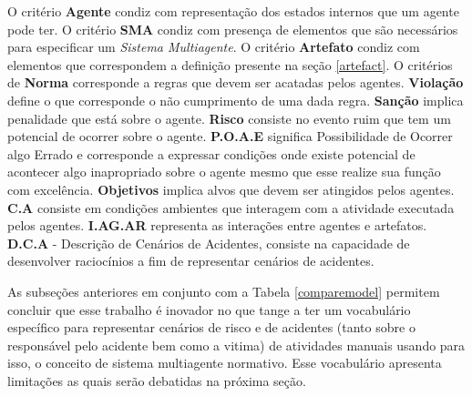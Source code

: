O critério \textbf{Agente} condiz com representação dos estados internos que um agente pode ter. O critério \textbf{SMA} condiz com presença de elementos que são necessários para especificar um \textit{Sistema Multiagente}. O critério \textbf{Artefato} condiz com elementos que correspondem a definição presente na seção \ref{artefact}. O critérios de \textbf{Norma} corresponde a regras que devem ser acatadas pelos agentes. \textbf{Violação} define o que corresponde o não cumprimento de uma dada regra. \textbf{Sanção} implica penalidade que está sobre o agente. \textbf{Risco} consiste no evento ruim que tem um potencial de ocorrer sobre o agente. \textbf{P.O.A.E} significa Possibilidade de Ocorrer algo Errado e corresponde a expressar condições onde existe potencial de acontecer algo inapropriado sobre o agente mesmo que esse realize sua função com excelência.  \textbf{Objetivos} implica alvos que devem ser atingidos pelos agentes. \textbf{C.A} consiste em condições ambientes que interagem com a atividade executada pelos agentes. \textbf{I.AG.AR} representa as interações entre agentes e artefatos. \textbf{D.C.A} - Descrição de Cenários de Acidentes, consiste na capacidade de desenvolver raciocínios a fim de representar cenários de acidentes.

As subseções anteriores em conjunto com a Tabela \ref{comparemodel} permitem concluir que esse trabalho é inovador no que tange a ter um vocabulário específico para representar cenários de risco e de acidentes (tanto sobre o responsável pelo acidente bem como a vitima) de atividades manuais usando para isso, o conceito de sistema multiagente normativo. Esse vocabulário apresenta limitações as quais serão debatidas na próxima seção. 